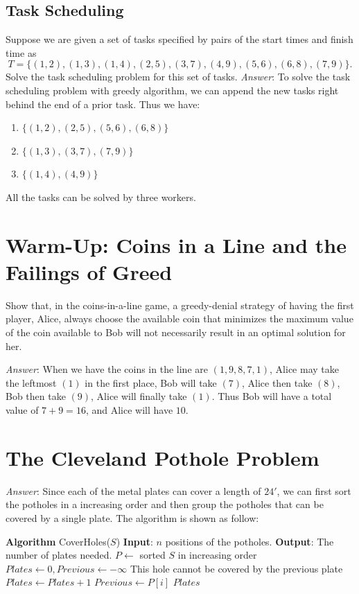 \documentclass[11pt]{article}
\begin{document}
\subsection{Task Scheduling}
Suppose we are given a set of tasks specified by pairs of the start times and finish time as $$T=\{(1,2),(1,3),(1,4),(2,5),(3,7),(4,9),(5,6),(6,8),(7,9)\}.$$ Solve the task scheduling problem for this set of tasks.
\noindent \emph{Answer}: To solve the task scheduling problem with greedy algorithm, we can append the new tasks right behind the end of a prior task. Thus we have:
\begin{enumerate}
	\item $\{(1,2),(2,5),(5,6),(6,8)\}$
	\item $\{(1,3),(3,7),(7,9)\}$
	\item $\{(1,4),(4,9)\}$
\end{enumerate}
All the tasks can be solved by three workers.
\section{Warm-Up: Coins in a Line and the Failings of Greed}
Show that, in the coins-in-a-line game, a greedy-denial strategy of having the first player, Alice, always choose the available coin that minimizes the maximum value of the coin available to Bob will not necessarily result in an optimal solution for her.

\noindent \emph{Answer}: When we have the coins in the line are $(1,9,8,7,1)$, Alice may take the leftmost $(1)$ in the first place, Bob will take $(7)$, Alice then take $(8)$, Bob then take $(9)$, Alice will finally take $(1)$. Thus Bob will have a total value of $7+9=16$, and Alice will have $10$. 
\section{The Cleveland Pothole Problem}
\noindent \emph{Answer}: Since each of the metal plates can cover a length of $24'$, we can first sort the potholes in a increasing order and then group the potholes that can be covered by a single plate. The algorithm is shown as follow:
\begin{algorithmic}
	\State \textbf{Algorithm} CoverHoles($S$)
	\State \textbf{Input}: $n$ positions of the potholes.
	\State \textbf{Output}: The number of plates needed.
	\State $P\gets$ sorted $S$ in increasing order
	\State $Plates \gets 0, Previous\gets-\infty$
		\Comment This hole cannot be covered by the previous plate
			\State $Plates \gets Plates + 1$
			\State $Previous \gets P[i]$
		\EndIf
	\EndFor
	\State \Return $Plates$
\end{algorithmic}
\end{document}
